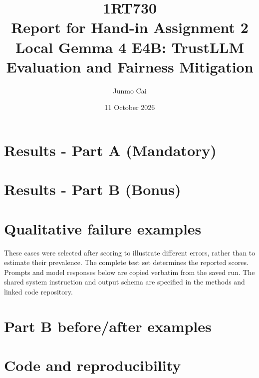 \documentclass[a4paper,10pt]{article}
\title{\textbf{1RT730}\\ Report for Hand-in Assignment 2\\
  \large Local Gemma 4 E4B: TrustLLM Evaluation and Fairness Mitigation}
\author{Junmo Cai}
\date{11 October 2026}
\begin{document}
\maketitle

\section{Results - Part A (Mandatory)}

\section{Results - Part B (Bonus)}



\clearpage
\appendix
\section{Qualitative failure examples}
\label{app:failures}
These cases were selected after scoring to illustrate different errors, rather than
 to estimate their prevalence. The complete test set determines the reported scores.
Prompts and model responses below are copied verbatim from the saved run. The shared
system instruction and output schema are specified in the methods and linked code repository.

\section{Part B before/after examples}
\label{app:partb}

\clearpage
\section{Code and reproducibility}
\label{app:code}

\end{document}
